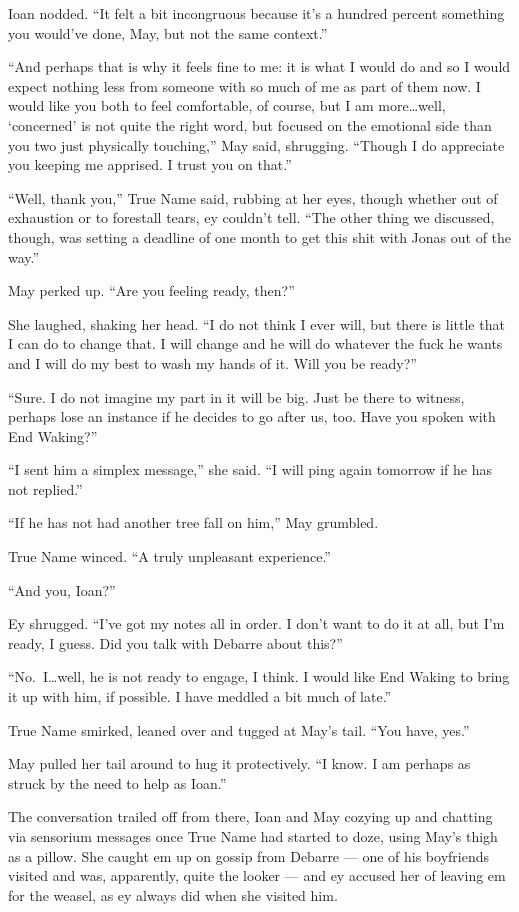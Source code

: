 Ioan nodded. ``It felt a bit incongruous because it's a hundred percent something you would've done, May, but not the same context.''

``And perhaps that is why it feels fine to me: it is what I would do and so I would expect nothing less from someone with so much of me as part of them now. I would like you both to feel comfortable, of course, but I am more\ldots well, `concerned' is not quite the right word, but focused on the emotional side than you two just physically touching,'' May said, shrugging. ``Though I do appreciate you keeping me apprised. I trust you on that.''

``Well, thank you,'' True Name said, rubbing at her eyes, though whether out of exhaustion or to forestall tears, ey couldn't tell. ``The other thing we discussed, though, was setting a deadline of one month to get this shit with Jonas out of the way.''

May perked up. ``Are you feeling ready, then?''

She laughed, shaking her head. ``I do not think I ever will, but there is little that I can do to change that. I will change and he will do whatever the fuck he wants and I will do my best to wash my hands of it. Will you be ready?''

``Sure. I do not imagine my part in it will be big. Just be there to witness, perhaps lose an instance if he decides to go after us, too. Have you spoken with End Waking?''

``I sent him a simplex message,'' she said. ``I will ping again tomorrow if he has not replied.''

``If he has not had another tree fall on him,'' May grumbled.

True Name winced. ``A truly unpleasant experience.''

``And you, Ioan?''

Ey shrugged. ``I've got my notes all in order. I don't want to do it at all, but I'm ready, I guess. Did you talk with Debarre about this?''

``No.~I\ldots well, he is not ready to engage, I think. I would like End Waking to bring it up with him, if possible. I have meddled a bit much of late.''

True Name smirked, leaned over and tugged at May's tail. ``You have, yes.''

May pulled her tail around to hug it protectively. ``I know. I am perhaps as struck by the need to help as Ioan.''

The conversation trailed off from there, Ioan and May cozying up and chatting via sensorium messages once True Name had started to doze, using May's thigh as a pillow. She caught em up on gossip from Debarre — one of his boyfriends visited and was, apparently, quite the looker — and ey accused her of leaving em for the weasel, as ey always did when she visited him.

